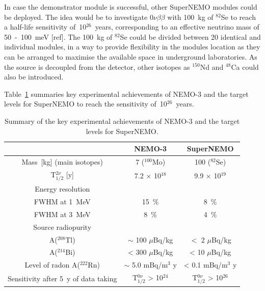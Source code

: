 \documentclass[main.tex]{subfiles}
\begin{document}
\bigskip


\NI In case the demonstrator module is successful, other SuperNEMO modules could be deployed. The idea would be to investigate 0$\nu\beta\beta$ with 100~kg of $^{\text{82}}$Se to reach a half-life sensitivity of~10$^{\text{26}}$~years, corresponding to an effective neutrino mass of 50~-~100~meV [ref]. The 100~kg of $^{\text{82}}$Se could be divided between 20 identical and individual modules, in a way to provide flexibility in the modules location as they can be arranged to maximise the available space in underground laboratories. As the source is decoupled from the detector, other isotopes as $^{\text{150}}$Nd and $^{\text{48}}$Ca could also be introduced.


\bigskip


\NI Table~\ref{tab:DifferenceNEMO3-SuperNEMO} summaries key experimental achievements of NEMO-3 and the target levels for SuperNEMO to reach the sensitivity of~10$^{\text{26}}$~years. 


\begin{table}[h!]
\centering
\begin{tabular}{c|c|c}
\toprule
      & NEMO-3 & SuperNEMO \\
\hline
Mass~[kg] (main isotopes)           & 7 ($^{\text{100}}$Mo)         & 100 ($^{\text{82}}$Se)        \\[0.1cm]
 T$_{\text{1/2}}^{\text{2}\nu}$ [y] & 7.2 $\times$ 10$^{\text{18}}$ & 9.9 $\times$ 10$^{\text{19}}$ \\[0.1cm]
\hline
Energy resolution & & \\
FWHM at 1~MeV                       & 15~\%                         & 8~\%                          \\[0.1cm]
FWHM at 3~MeV                       & 8~\%                          & 4~\%                          \\[0.1cm]
\hline
Source radiopurity & & \\
A($^{\text{208}}$Tl)               & $\sim$ 100 $\mu$Bq/kg         & $<$ 2 $\mu$Bq/kg               \\[0.1cm]
A($^{\text{214}}$Bi)               & < 300 $\mu$Bq/kg              & < 10 $\mu$Bq/kg                \\[0.1cm]
\hline
Level of radon A($^{\text{222}}$Rn)& $\sim$ 5.0 mBq/m$^\text{3}$ y   & < 0.1 mBq/m$^\text{3}$ y     \\[0.1cm]
\hline
Sensitivity after 5~y of data taking & T$_{\text{1/2}}^{\text{0}\nu}$ > 10$^{\text{24}}$ & T$_{\text{1/2}}^{\text{0}\nu}$ > 10$^{\text{26}}$     \\[0.1cm]
\bottomrule
\end{tabular}
\caption{Summary of the key experimental achievements of NEMO-3 and the target levels for SuperNEMO.}
\label{tab:DifferenceNEMO3-SuperNEMO}
\end{table}  


\FloatBarrier
\end{document}
